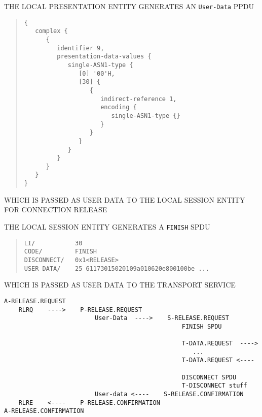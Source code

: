 \begin{bwslide}

\begin{nrtc}
\item	THE LOCAL PRESENTATION ENTITY GENERATES AN \verb"User-Data" PPDU
\begin{quote}\small\begin{verbatim}
{
   complex {
      {
         identifier 9,
         presentation-data-values {
            single-ASN1-type {
               [0] '00'H,
               [30] {
                  {
                     indirect-reference 1,
                     encoding {
                        single-ASN1-type {}
                     }
                  }
               }
            }
         }
      }
   }
}
\end{verbatim}\end{quote}

\item	WHICH IS PASSED AS USER DATA TO THE LOCAL SESSION ENTITY FOR
	CONNECTION RELEASE
\end{nrtc}
\end{bwslide}


\begin{bwslide}

\begin{nrtc}
\item	THE LOCAL SESSION ENTITY GENERATES A \verb"FINISH" SPDU
\begin{quote}\small\begin{verbatim}
LI/           30
CODE/         FINISH
DISCONNECT/   0x1<RELEASE>
USER DATA/    25 61173015020109a010620e800100be ...
\end{verbatim}\end{quote}

\item	WHICH IS PASSED AS USER DATA TO THE TRANSPORT SERVICE
\end{nrtc}
\end{bwslide}


\begin{bwslide}

\scriptsize
\begin{verbatim}
A-RELEASE.REQUEST
    RLRQ    ---->    P-RELEASE.REQUEST
                         User-Data  ---->    S-RELEASE.REQUEST
                                                 FINISH SPDU

                                                 T-DATA.REQUEST  ---->
                                                    ...
                                                 T-DATA.REQUEST <----

                                                 DISCONNECT SPDU
                                                 T-DISCONNECT stuff
                         User-data <----    S-RELEASE.CONFIRMATION
    RLRE    <----    P-RELEASE.CONFIRMATION
A-RELEASE.CONFIRMATION
\end{verbatim}
\end{bwslide}
